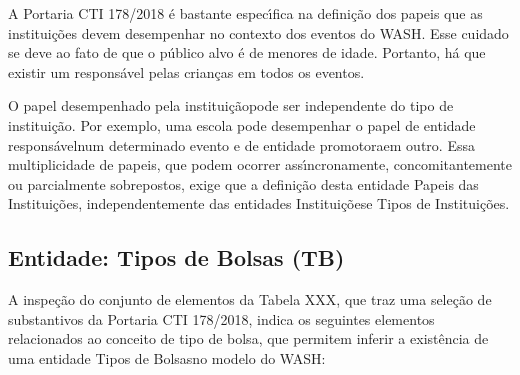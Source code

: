 \documentclass[
12pt,		%
openright,	%
twoside,  %
a4paper,			%
chapter=TITLE,		%
english,			%
french,				%
spanish,			%
brazil				%
]{USPSC-classe/USPSC}
\begin{document}
\noindent\begin{center}\mbox{\centering{}}\end{center}


A Portaria CTI 178/2018 \'e bastante espec\'{\i}fica na defini\c{c}\~ao dos papeis que as institui\c{c}\~oes devem desempenhar no contexto dos eventos do WASH. Esse cuidado se deve ao fato de que o p\'ublico alvo \'e de menores de idade. Portanto, h\'a que existir um respons\'avel pelas crian\c{c}as em todos os eventos.




O \textquotedbl papel desempenhado pela institui\c{c}\~ao\textquotedbl  pode ser independente do \textquotedbl tipo de institui\c{c}\~ao\textquotedbl . Por exemplo, uma escola pode desempenhar o papel de \textquotedbl entidade respons\'avel\textquotedbl  num determinado evento e de \textquotedbl entidade promotora\textquotedbl  em outro. Essa multiplicidade de papeis, que podem ocorrer ass\'{\i}ncronamente, concomitantemente ou parcialmente sobrepostos, exige que a defini\c{c}\~ao desta entidade \textquotedbl Papeis das Institui\c{c}\~oes\textquotedbl , independentemente das entidades \textquotedbl Institui\c{c}\~oes\textquotedbl  e \textquotedbl Tipos de Institui\c{c}\~oes\textquotedbl .




\subsection[Entidade: Tipos de Bolsas (TB)]{Entidade: Tipos de Bolsas (TB)}\label{Entidade: Tipos de Bolsas (TB)}
A inspe\c{c}\~ao do conjunto de elementos da Tabela XXX, que traz uma sele\c{c}\~ao de substantivos da Portaria CTI 178/2018, indica os seguintes elementos relacionados ao conceito de \textquotedbl tipo de bolsa\textquotedbl , que permitem inferir a exist\^encia de uma entidade \textquotedbl Tipos de Bolsas\textquotedbl  no modelo do WASH:





\noindent\begin{center}\mbox{\centering{}}\end{center}
\end{document}
